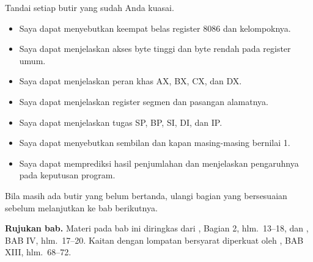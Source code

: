 \begin{checklistbox}
\vspace{1.1em}
Tandai setiap butir yang sudah Anda kuasai.

\begin{itemize}
    \item[\checkbox] Saya dapat menyebutkan keempat belas register
          8086 dan kelompoknya.
    \item[\checkbox] Saya dapat menjelaskan akses byte tinggi dan
          byte rendah pada register umum.
    \item[\checkbox] Saya dapat menjelaskan peran khas AX, BX, CX,
          dan DX.
    \item[\checkbox] Saya dapat menjelaskan register segmen dan
          pasangan alamatnya.
    \item[\checkbox] Saya dapat menjelaskan tugas SP, BP, SI, DI,
          dan IP.
    \item[\checkbox] Saya dapat menyebutkan sembilan  dan
          kapan masing-masing bernilai 1.
    \item[\checkbox] Saya dapat memprediksi  hasil
          penjumlahan dan menjelaskan pengaruhnya pada keputusan
          program.
\end{itemize}

\vspace{0.4em}
Bila masih ada butir yang belum bertanda, ulangi bagian yang
bersesuaian sebelum melanjutkan ke bab berikutnya.
\end{checklistbox}

\begin{infobox}
\vspace{1.1em}
\textbf{Rujukan bab.} Materi pada bab ini diringkas dari
\cite{gunawan2019}, Bagian 2, hlm.~13--18, dan \cite{sto2001},
BAB IV, hlm.~17--20. Kaitan  dengan lompatan bersyarat
diperkuat oleh \cite{sto2001}, BAB XIII, hlm.~68--72.
\end{infobox}
